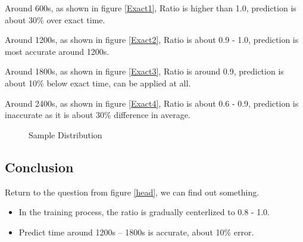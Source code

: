 \documentclass[fontset=none]{ctexart}
\theoremstyle{definition}
\theoremstyle{remark}
\begin{document}
            Around 600s, as shown in figure \ref{Exact1}, Ratio is higher than 1.0, prediction is about 30\% over exact time.

            Around 1200s, as shown in figure \ref{Exact2}, Ratio is about 0.9 - 1.0, prediction is most accurate around 1200s.

            Around 1800s, as shown in figure \ref{Exact3}, Ratio is around 0.9, prediction is about 10\% below exact time, can be applied at all.

            Around 2400s, as shown in figure \ref{Exact4}, Ratio is about 0.6 - 0.9, prediction is inaccurate as it is about 30\% difference in average.

            \begin{figure}[H]
                \centering
                \quad
                \newline
                \quad
                \newline
                \caption{Sample Distribution}
                \label{Samples}
            \end{figure}

        \subsection{Conclusion}

            Return to the question from figure \ref{head}, we can find out something.

            \begin{itemize}

                \item In the training process, the ratio is gradually centerlized to 0.8 - 1.0.
                
                \item Predict time around 1200s – 1800s is accurate, about 10\% error. 
            
            \end{itemize}
\end{document}
